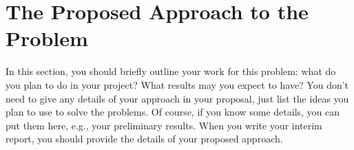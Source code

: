 \chapter{The Proposed Approach to the Problem}
In this section, you should briefly outline your work for this problem: what do you
plan to do in your project? What results may you expect to have? You don't need to
give any details of your approach in your proposal, just list the ideas you plan to use to
solve the problems. Of course, if you know some details, you can put them here, e.g.,
your preliminary results. When you write your interim report, you should provide the
details of your proposed approach.